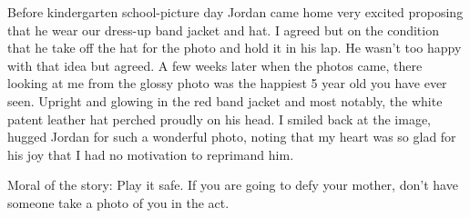 \begin{window}
\smallskip
Before kindergarten school-picture day Jordan came home very excited proposing
that he wear our dress-up band jacket and hat. I agreed but on the condition
that he take off the hat for the photo and hold it in his lap. He wasn't too
happy with that idea but agreed. A few weeks later when the photos came, there
looking at me from the glossy photo was the happiest 5 year old you have ever
seen. Upright and glowing in the red band jacket and most notably, the white
patent leather hat perched proudly on his head.  I smiled back at the image,
hugged Jordan for such a wonderful photo, noting that my heart was so glad for
his joy that I had no motivation to reprimand him.

Moral of the story: Play it safe. If you are going to defy your mother, don't
have someone take a photo of you in the act.
\end{window}
